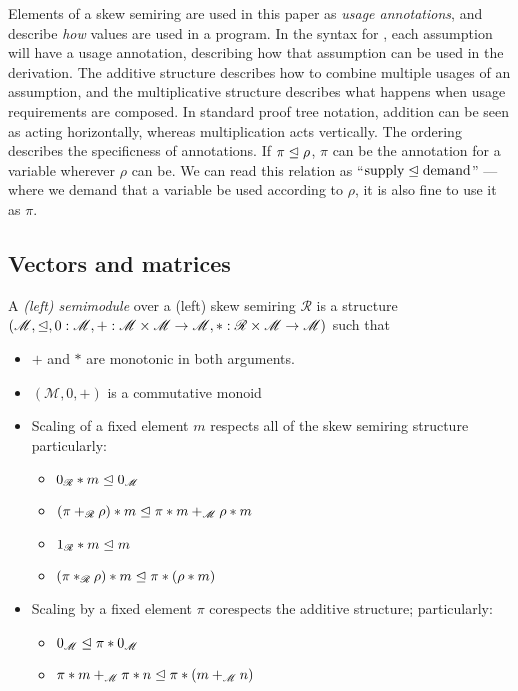 \documentclass[submission,copyright,creativecommons]{eptcs}
\begin{document}
Elements of a skew semiring are used in this paper as \emph{usage annotations},
and describe \emph{how} values are used in a program.
In the syntax for \name, each assumption will have a usage annotation,
describing how that assumption can be used in the derivation.
The additive structure describes how to combine multiple usages of an
assumption, and the multiplicative structure describes what happens when usage
requirements are composed.
In standard proof tree notation, addition can be seen as acting horizontally,
whereas multiplication acts vertically.
The ordering describes the specificness of annotations.
If $\pi \trianglelefteq \rho$, $\pi$ can be the annotation for a variable wherever
$\rho$ can be.
We can read this relation as ``$\textrm{supply} \trianglelefteq \textrm{demand}$'' ---
where we demand that a variable be used according to $\rho$, it is also fine to
use it as $\pi$.

\subsection{Vectors and matrices}

\begin{definition}
  A \emph{(left) semimodule} over a (left) skew semiring $\mathscr R$ is a
  structure
  $(\mathscr M, \trianglelefteq,
  0 : \mathscr M, + : \mathscr M \times \mathscr M \to \mathscr M,
  * : \mathscr R \times \mathscr M \to \mathscr M)$ such that
  \begin{itemize}
    \item $+$ and $*$ are monotonic in both arguments.
    \item $(\mathscr M, 0, +)$ is a commutative monoid
    \item Scaling of a fixed element $m$ respects all of the skew semiring
      structure particularly:
      \begin{itemize}
        \item $0_\mathscr R * m \trianglelefteq 0_\mathscr M$
        \item $(\pi +_\mathscr R \rho) * m \trianglelefteq \pi * m +_\mathscr M \rho * m$
        \item $1_\mathscr R * m \trianglelefteq m$
        \item $(\pi *_\mathscr R \rho) * m \trianglelefteq \pi * (\rho * m)$
      \end{itemize}
    \item Scaling by a fixed element $\pi$ corespects the additive structure;
      particularly:
      \begin{itemize}
        \item $0_\mathscr M \trianglelefteq \pi * 0_\mathscr M$
        \item $\pi * m +_\mathscr M \pi * n \trianglelefteq \pi * (m +_\mathscr M n)$
      \end{itemize}
  \end{itemize}
\end{definition}
\end{document}
